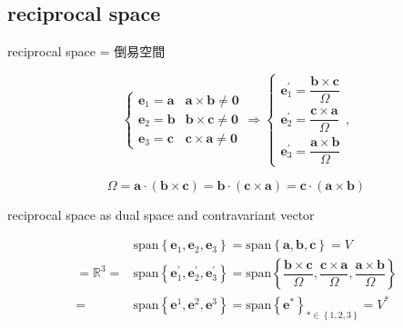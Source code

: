 \documentclass[
]{book}
\theoremstyle{definition}
\theoremstyle{definition}
\theoremstyle{definition}
\theoremstyle{definition}
\theoremstyle{remark}
\begin{document}
\subsection{reciprocal space}\label{reciprocal-space}

\begin{CJK}{UTF8}{bsmi}
reciprocal space = 倒易空間
\end{CJK}

\[
\begin{cases}
\boldsymbol{e}_{{\scriptscriptstyle 1}}=\boldsymbol{a} & \boldsymbol{a}\times\boldsymbol{b}\ne\boldsymbol{0}\\
\boldsymbol{e}_{{\scriptscriptstyle 2}}=\boldsymbol{b} & \boldsymbol{b}\times\boldsymbol{c}\ne\boldsymbol{0}\\
\boldsymbol{e}_{{\scriptscriptstyle 3}}=\boldsymbol{c} & \boldsymbol{c}\times\boldsymbol{a}\ne\boldsymbol{0}
\end{cases}\Rightarrow\begin{cases}
\boldsymbol{e}_{{\scriptscriptstyle 1}}^{\prime}=\dfrac{\boldsymbol{b}\times\boldsymbol{c}}{\Omega}\\
\boldsymbol{e}_{{\scriptscriptstyle 2}}^{\prime}=\dfrac{\boldsymbol{c}\times\boldsymbol{a}}{\Omega}\\
\boldsymbol{e}_{{\scriptscriptstyle 3}}^{\prime}=\dfrac{\boldsymbol{a}\times\boldsymbol{b}}{\Omega}
\end{cases},
\]

\[
\Omega=\boldsymbol{a}\cdot\left(\boldsymbol{b}\times\boldsymbol{c}\right)=\boldsymbol{b}\cdot\left(\boldsymbol{c}\times\boldsymbol{a}\right)=\boldsymbol{c}\cdot\left(\boldsymbol{a}\times\boldsymbol{b}\right)
\]

reciprocal space as dual space and contravariant vector

\[
\begin{aligned}
 & \mathrm{span}\left\{ \boldsymbol{e}_{{\scriptscriptstyle 1}},\boldsymbol{e}_{{\scriptscriptstyle 2}},\boldsymbol{e}_{{\scriptscriptstyle 3}}\right\} =\mathrm{span}\left\{ \boldsymbol{a},\boldsymbol{b},\boldsymbol{c}\right\} =V\\
=\mathbb{R}^{3}= & \mathrm{span}\left\{ \boldsymbol{e}_{{\scriptscriptstyle 1}}^{\prime},\boldsymbol{e}_{{\scriptscriptstyle 2}}^{\prime},\boldsymbol{e}_{{\scriptscriptstyle 3}}^{\prime}\right\} =\mathrm{span}\left\{ \dfrac{\boldsymbol{b}\times\boldsymbol{c}}{\Omega},\dfrac{\boldsymbol{c}\times\boldsymbol{a}}{\Omega},\dfrac{\boldsymbol{a}\times\boldsymbol{b}}{\Omega}\right\} \\
= & \mathrm{span}\left\{ \boldsymbol{e}^{{\scriptscriptstyle 1}},\boldsymbol{e}^{{\scriptscriptstyle 2}},\boldsymbol{e}^{{\scriptscriptstyle 3}}\right\} =\mathrm{span}\left\{ \boldsymbol{e}^{{\scriptscriptstyle *}}\right\} _{{\scriptscriptstyle *\in\left\{ 1,2,3\right\} }}=V^{*}
\end{aligned}
\]
\end{document}

